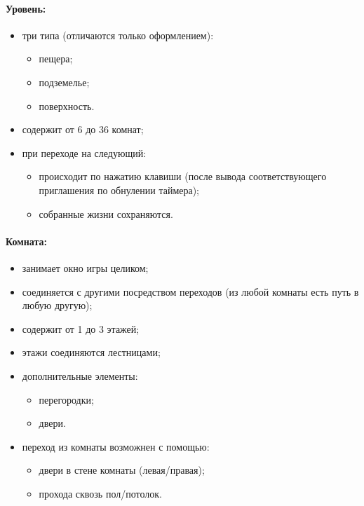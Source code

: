 \documentclass[12pt,a4paper,fullpage]{article}
\begin{document}
\paragraph{Уровень:}
\begin{itemize}
	\item три типа (отличаются только оформлением):
	\begin{itemize}
		\item пещера;
		\item подземелье;
		\item поверхность.
	\end{itemize}
	\item содержит от 6 до 36 комнат;
	\item при переходе на следующий:
	\begin{itemize}
		\item происходит по нажатию клавиши (после вывода соответствующего приглашения по обнулении таймера);
		\item собранные жизни сохраняются.
	\end{itemize}
\end{itemize}

\paragraph{Комната:}
\begin{itemize}
	\item занимает окно игры целиком;
	\item соединяется с другими посредством переходов (из любой комнаты есть путь в любую другую);
	\item содержит от 1 до 3 этажей;
	\item этажи соединяются лестницами;
	\item дополнительные элементы:
	\begin{itemize}
		\item перегородки;
		\item двери.
	\end{itemize}
	\item переход из комнаты возможнен с помощью:
	\begin{itemize}
		\item двери в стене комнаты (левая/правая);
		\item прохода сквозь пол/потолок.
	\end{itemize}
\end{itemize}
\end{document}

